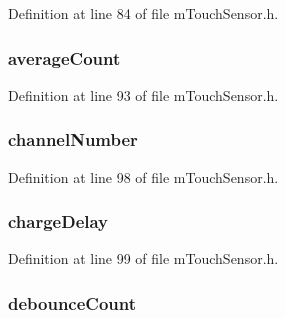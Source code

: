 Definition at line 84 of file m\+Touch\+Sensor.\+h.

\hypertarget{structtag___s_e_n_s_o_r_af982393c43872bd9608e53a411ed5d77}{}
\subsubsection[{average\+Count}]{ average\+Count}\label{structtag___s_e_n_s_o_r_af982393c43872bd9608e53a411ed5d77}


Definition at line 93 of file m\+Touch\+Sensor.\+h.

\hypertarget{structtag___s_e_n_s_o_r_aa5a5ad634a8b47b7533d8e0bbc0d39ed}{}
\subsubsection[{channel\+Number}]{ channel\+Number}\label{structtag___s_e_n_s_o_r_aa5a5ad634a8b47b7533d8e0bbc0d39ed}


Definition at line 98 of file m\+Touch\+Sensor.\+h.

\hypertarget{structtag___s_e_n_s_o_r_a2aab41eb14b56632a983d442aa852b94}{}
\subsubsection[{charge\+Delay}]{ charge\+Delay}\label{structtag___s_e_n_s_o_r_a2aab41eb14b56632a983d442aa852b94}


Definition at line 99 of file m\+Touch\+Sensor.\+h.

\hypertarget{structtag___s_e_n_s_o_r_afd41567da9b02bcbd82d74221f7a4823}{}
\subsubsection[{debounce\+Count}]{ debounce\+Count}\label{structtag___s_e_n_s_o_r_afd41567da9b02bcbd82d74221f7a4823}


